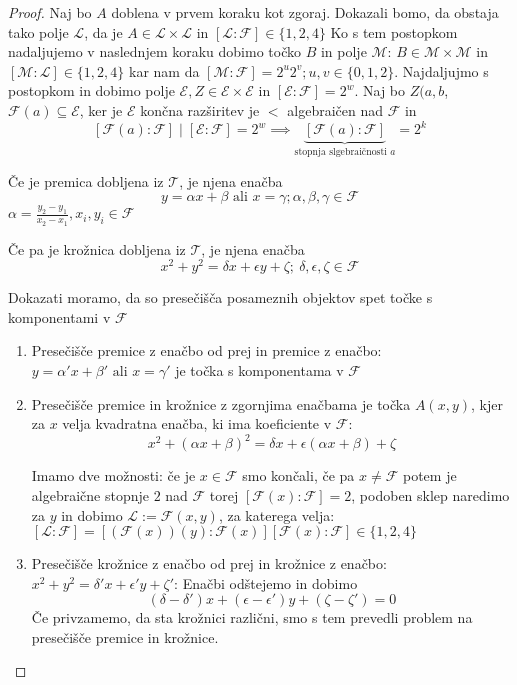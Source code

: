 \documentclass[a4paper]{article}
\begin{document}
\begin{proof}
Naj bo $A$ doblena v prvem koraku kot zgoraj. Dokazali bomo, da obstaja tako polje $\mathcal{L}$, da je $A \in \mathcal{L} \times \mathcal{L}$ in $[\mathcal{L}:\mathcal{F}] \in \{1,2,4\}$ Ko s tem postopkom nadaljujemo v naslednjem koraku dobimo točko $B$ in polje $\mathcal{M}$: $B \in \mathcal{M} \times \mathcal{M}$ in $[\mathcal{M}:\mathcal{L}] \in \{1,2,4\}$ kar nam da $[\mathcal{M}:\mathcal{F}] = 2^u2^v; u,v \in \{0,1,2\}$. Najdaljujmo s postopkom in dobimo polje $\mathcal{E}, Z \in \mathcal{E} \times \mathcal{E}$ in $[\mathcal{E}:\mathcal{F}] = 2^w$. Naj bo $Z(a,b$, $\mathcal{F}(a) \subseteq \mathcal{E}$, ker je $\mathcal{E}$ končna razširitev je $<$ algebraičen nad $\mathcal{F}$ in 
$$[\mathcal{F}(a):\mathcal{F}] \mid [\mathcal{E}:\mathcal{F}] = 2^w \implies \underbrace{[\mathcal{F}(a):\mathcal{F}]}_{\text{stopnja slgebraičnosti } a} = 2^k$$

Če je premica dobljena iz $\mathcal{T}$, je njena enačba
\begin{equation}
y = \alpha x + \beta \text{ ali } x = \gamma; \alpha, \beta, \gamma \in \mathcal{F}
\end{equation}
$\alpha = \frac{y_2 - y_1}{x_2 - x_1}, x_i, y_i \in \mathcal{F}$

Če pa je krožnica dobljena iz $\mathcal{T}$, je njena enačba
\begin{equation}
x^2 + y^2 = \delta x + \epsilon y + \zeta; \ \delta, \epsilon, \zeta \in \mathcal{F}
\end{equation}

Dokazati moramo, da so presečišča posameznih objektov spet točke s komponentami v $\mathcal{F}$


\begin{enumerate}
\item Presečišče premice z enačbo od prej in premice z enačbo: $y = \alpha' x + \beta' \text{ ali } x = \gamma'$ je točka s komponentama v $\mathcal{F}$

\item Presečišče premice in krožnice z zgornjima enačbama je točka $A(x,y)$, kjer za $x$ velja kvadratna enačba, ki ima koeficiente v $\mathcal{F}$:
$$x^2 + (\alpha x + \beta)^2 = \delta x + \epsilon(\alpha x + \beta) + \zeta$$ 

Imamo dve možnosti: če je $x \in \mathcal{F}$ smo končali, če pa $x \neq \mathcal{F}$ potem je algebraične stopnje $2$ nad $\mathcal{F}$ torej $[\mathcal{F}(x):\mathcal{F}] = 2$, podoben sklep naredimo za $y$ in dobimo $\mathcal{L} := \mathcal{F}(x,y)$, za katerega velja: $[\mathcal{L}:\mathcal{F}] = [(\mathcal{F}(x))(y):\mathcal{F}(x)][\mathcal{F}(x):\mathcal{F}] \in \{1,2,4\}$ 

\item Presečišče krožnice z enačbo od prej in krožnice z enačbo: $x^2 + y^2 = \delta' x + \epsilon' y + \zeta'$: Enačbi odštejemo in dobimo 
$$(\delta - \delta')x + (\epsilon - \epsilon')y + (\zeta - \zeta') = 0$$
Če privzamemo, da sta krožnici različni, smo s tem prevedli problem na presečišče premice in krožnice.
\end{enumerate}

\end{proof}
\end{document}
